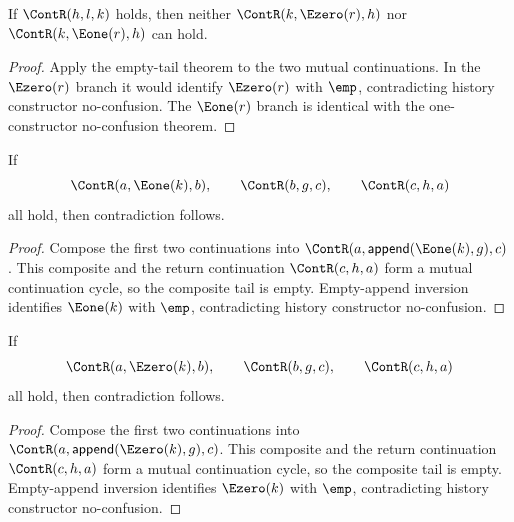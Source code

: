 \begin{theorem}
\label{thm:cont-mutual-extension-right-tail-absurd}
If $\ContR(h,l,k)$ holds, then neither $\ContR(k,\Ezero(r),h)$ nor
$\ContR(k,\Eone(r),h)$ can hold.
\end{theorem}
\begin{proof}
Apply the empty-tail theorem to the two mutual continuations. In the
$\Ezero(r)$ branch it would identify $\Ezero(r)$ with $\emp$, contradicting
history constructor no-confusion. The $\Eone(r)$ branch is identical with the
one-constructor no-confusion theorem.
\end{proof}

\begin{theorem}
\label{thm:cont-triangle-cycle-left-visible-tail-absurd}
If
$$
\ContR(a,\Eone(k),b),\qquad
\ContR(b,g,c),\qquad
\ContR(c,h,a)
$$
all hold, then contradiction follows.
\end{theorem}
\begin{proof}
Compose the first two continuations into
$\ContR(a,\mathsf{append}(\Eone(k),g),c)$. This composite and the return
continuation $\ContR(c,h,a)$ form a mutual continuation cycle, so the composite
tail is empty. Empty-append inversion identifies $\Eone(k)$ with $\emp$,
contradicting history constructor no-confusion.
\end{proof}

\begin{theorem}
\label{thm:cont-triangle-cycle-left-zero-tail-absurd}
If
$$
\ContR(a,\Ezero(k),b),\qquad
\ContR(b,g,c),\qquad
\ContR(c,h,a)
$$
all hold, then contradiction follows.
\end{theorem}
\begin{proof}
Compose the first two continuations into
$\ContR(a,\mathsf{append}(\Ezero(k),g),c)$. This composite and the return
continuation $\ContR(c,h,a)$ form a mutual continuation cycle, so the composite
tail is empty. Empty-append inversion identifies $\Ezero(k)$ with $\emp$,
contradicting history constructor no-confusion.
\end{proof}

